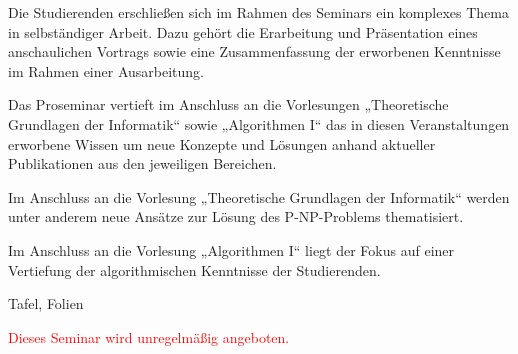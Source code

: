 \begin{course}
\begin{learningoutcomes}
 

Die Studierenden erschließen sich im Rahmen des Seminars ein komplexes Thema in selbständiger Arbeit. Dazu gehört die Erarbeitung und Präsentation eines anschaulichen Vortrags sowie eine Zusammenfassung der erworbenen Kenntnisse im Rahmen einer Ausarbeitung.


\end{learningoutcomes}

\begin{content}
Das Proseminar vertieft im Anschluss an die Vorlesungen „Theoretische Grundlagen der Informatik“ sowie „Algorithmen I“ das in diesen Veranstaltungen erworbene Wissen um neue Konzepte und Lösungen anhand aktueller Publikationen aus den jeweiligen Bereichen.

 

Im Anschluss an die Vorlesung „Theoretische Grundlagen der Informatik“ werden unter anderem neue Ansätze zur Lösung des P-NP-Problems thematisiert.

 

Im Anschluss an die Vorlesung „Algorithmen I“ liegt der Fokus auf einer Vertiefung der algorithmischen Kenntnisse der Studierenden.


\end{content}

\begin{media}Tafel, Folien

\end{media}



\begin{remarks}\textcolor{red}{Dieses Seminar wird unregelmäßig angeboten.}

\end{remarks}

\end{course}